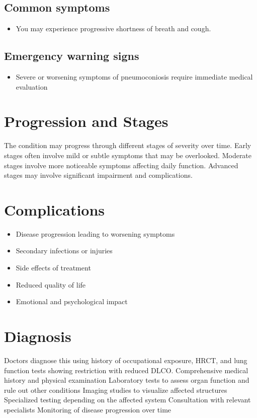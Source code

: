 \subsection{Common symptoms}
\begin{itemize}[noitemsep]
  \item You may experience progressive shortness of breath and cough. 
  \end{itemize}

\subsection{Emergency warning signs}
\begin{itemize}[noitemsep]
  \item Severe or worsening symptoms of pneumoconiosis require immediate medical evaluation
\end{itemize}
\section{Progression and Stages}
The condition may progress through different stages of severity over time. Early stages often involve mild or subtle symptoms that may be overlooked. Moderate stages involve more noticeable symptoms affecting daily function. Advanced stages may involve significant impairment and complications.
\section{Complications}
\begin{itemize}[noitemsep]
  \item Disease progression leading to worsening symptoms
  \item Secondary infections or injuries
  \item Side effects of treatment
  \item Reduced quality of life
  \item Emotional and psychological impact
\end{itemize}
\section{Diagnosis}
Doctors diagnose this using history of occupational exposure, HRCT, and lung function tests showing restriction with reduced DLCO. Comprehensive medical history and physical examination Laboratory tests to assess organ function and rule out other conditions Imaging studies to visualize affected structures Specialized testing depending on the affected system Consultation with relevant specialists Monitoring of disease progression over time


